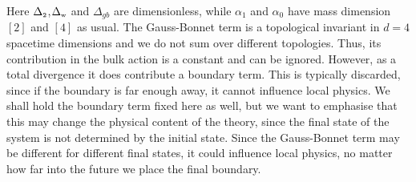 \documentclass[aps,preprintnumbers,superscriptaddress,longbibliography]{revtex4-1}
\def\R2Term{\Delta_{\text{\tiny 2}}}
\def\WeylTerm{\Delta_{\text{\tiny w}}}
\begin{document}
Here $\R2Term$,$\WeylTerm$ and $\Delta_{gb}$ are dimensionless, while $\alpha_1$ and $\alpha_0$ have mass dimension $[2]$ and $[4]$ as usual. The Gauss-Bonnet term is a topological invariant in $d=4$ spacetime dimensions and we do not sum over different topologies. Thus, its contribution in the bulk action is a constant and can be ignored. However, as a total divergence it does contribute a boundary term. This is typically discarded, since if the boundary is far enough away, it cannot influence local physics. We shall hold the boundary term fixed here as well, but we want to emphasise that this may change the physical content of the theory, since the final state of the system is not determined by the initial state. Since the Gauss-Bonnet term may be different for different final states, it could influence local physics, no matter how far into the future we place the final boundary. 
\end{document}
